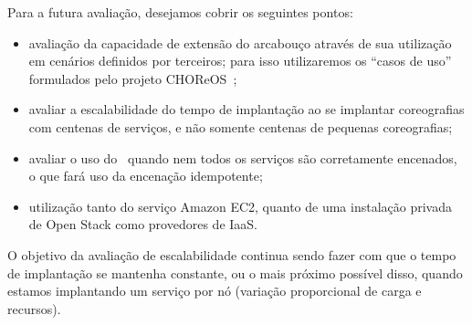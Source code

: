 Para a futura avaliação, desejamos cobrir os seguintes pontos:

\begin{itemize}
\item avaliação da capacidade de extensão do arcabouço através de sua utilização em cenários definidos por terceiros; para isso utilizaremos os ``casos de uso'' formulados pelo projeto CHOReOS~\cite{Choreos2011D6.1, Choreos2011D8.1};
\item avaliar a escalabilidade do tempo de implantação ao se implantar coreografias com centenas de serviços, e não somente centenas de pequenas coreografias;
\item avaliar o uso do \ee\ quando nem todos os serviços são corretamente encenados, o que fará uso da encenação idempotente;
\item utilização tanto do serviço Amazon EC2, quanto de uma instalação privada de Open Stack como provedores de IaaS.
\end{itemize}

O objetivo da avaliação de escalabilidade continua sendo fazer com que o tempo de implantação se mantenha constante, ou o mais próximo possível disso, quando estamos implantando um serviço por nó (variação proporcional de carga e recursos).
